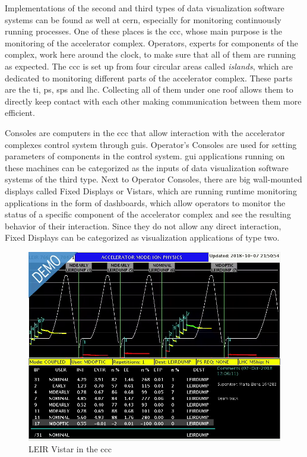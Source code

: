 Implementations of the second and third types of data visualization software
systems can be found as well at \gls{cern}, especially for monitoring
continuously running processes. One of these places is the \gls{ccc}, whose
main purpose is the monitoring of the accelerator complex. Operators, experts
for components of the complex, work here around the clock, to make sure that all
of them are running as expected. The \gls{ccc} is set up from four circular
areas called \emph{islands}, which are dedicated to monitoring different parts of
the accelerator complex. These parts are the \gls{ti}, \gls{ps}, \gls{sps} and
\gls{lhc}. Collecting all of them under one roof allows them to directly keep
contact with each other making communication between them more efficient.
\cite{DayInCCC}

Consoles are computers in the \gls{ccc} that allow interaction with the
accelerator complexes control system through \glspl{gui}. Operator's Consoles
are used for setting parameters of components in the control system. \gls{gui}
applications running on these machines can be categorized as the inputs of data
visualization software systems of the third type.  Next to Operator Consoles,
there are big wall-mounted displays called Fixed Displays or Vistars, which are
running runtime monitoring applications in the form of dashboards, which allow
operators to monitor the status of a specific component of the accelerator
complex and see the resulting behavior of their interaction. Since they do not
allow any direct interaction, Fixed Displays can be categorized as visualization
applications of type two.
\cite{ControlSystemBible}

\begin{figure}[h]
    \centering
    \includegraphics[width=12cm]{resources/img/LEIRVistar}
    \caption{LEIR Vistar in the \gls{ccc}}
    \label{fig:leir}
\end{figure}


